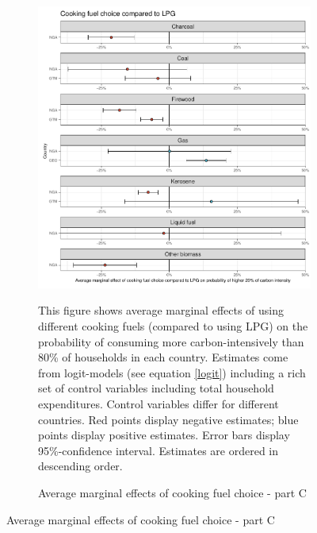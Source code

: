  \begin{figure}[ht!]\ContinuedFloat
   \centering
   \begin{subfigure}[b]{\textwidth}
   \centering
   \caption{Average marginal effects of cooking fuel choice - part C} \label{fig:Logit_ME_CF_3}
   \includegraphics{1_Figures/Analysis_Logit_Models_Marginal_Effects/Average_Marginal_Effects_affected_upper_80_CF_LPG_2017B.pdf}
   \begin{subcaption2}
     This figure shows average marginal effects of using different cooking fuels (compared to using LPG) on the probability of consuming more carbon-intensively than 80\% of households in each country. Estimates come from logit-models (see equation \ref{logit}) including a rich set of control variables including total household expenditures. Control variables differ for different countries. Red points display negative estimates; blue points display positive estimates. Error bars display 95\%-confidence interval. Estimates are ordered in descending order.
   \end{subcaption2}
   \end{subfigure}
 \end{figure}
 \clearpage

